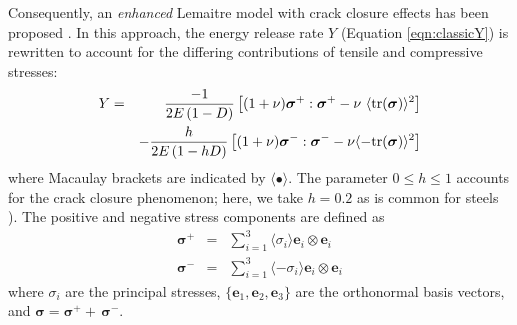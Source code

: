 \documentclass[sn-mathphys,Numbered,draft]{sn-jnl}%
\newcommand{\bb}{\boldsymbol}
\begin{document}
Consequently, an \emph{enhanced} Lemaitre model with crack closure effects has been proposed \cite{pires_issues_2005,teixeira_ductile_2010}.
In this approach, the energy release rate $Y$ (Equation \ref{eqn:classicY}) is rewritten to account for the differing contributions of tensile and compressive stresses:
\begin{eqnarray}
	Y &=&
	\frac{-1}{2E\left(1-D\right)}
	\left[(1 + \nu) \bb{\sigma}^+ : \bb{\sigma}^+ - \nu\ \langle \text{tr}(\boldsymbol{\sigma})\rangle^2\right] \notag \\
	&&-\frac{h}{2E\left(1-hD\right)}
	\left[(1 + \nu)\bb{\sigma}^- : \bb{\sigma}^- -\nu \langle -\text{tr}(\boldsymbol{\sigma})\rangle^2\right]
\end{eqnarray}
where Macaulay brackets are indicated by $\langle \bullet \rangle$.
The parameter $0\le h\le1$ accounts for the crack closure phenomenon; here, we take $h = 0.2$ as is common for steels \cite{desmorat_modeling_2008,lemaitre_course_1996,bouchard_enhanced_2011}). 
The positive and negative stress components are defined as
\begin{eqnarray}
	\boldsymbol{\sigma}^+&=&\sum_{i=1}^{3} \langle{\sigma}_i \rangle\mathbf{e}_i\otimes\mathbf{e}_i	\\
	\boldsymbol{\sigma}^-&=&\sum_{i=1}^{3}\langle{-{\sigma}}_i\rangle\mathbf{e}_i\otimes\mathbf{e}_i
\end{eqnarray}
where ${\sigma}_i$ are the principal stresses, $\{\mathbf{e}_1,\mathbf{e}_2,\mathbf{e}_3\}$ are the orthonormal basis vectors, and $\boldsymbol{\sigma} = \boldsymbol{\sigma}^+ + \, \boldsymbol{\sigma}^-$.
\end{document}
